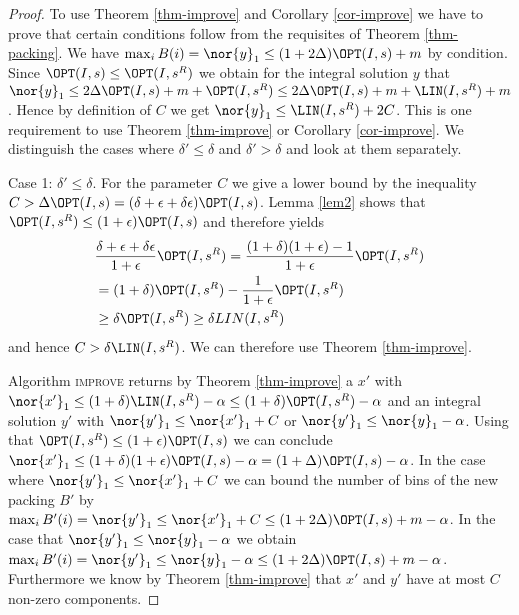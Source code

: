 \begin{proof}
	

    To use Theorem \ref{thm-improve} and Corollary \ref{cor-improve} we have to prove that certain conditions follow from the requisites of Theorem \ref{thm-packing}.
    We have $\max_i B (i) = \nor{y}_1 \leq (1+ 2\Delta) \OPT(I,s)+m$ by condition. Since
	$ \OPT(I,s) \leq  \OPT(I,s^{R})$ we obtain for the integral solution $y$ that
	$\nor{y}_1 \leq 2\Delta \OPT(I,s)+m + \OPT(I,s^{R}) \leq  2 \Delta \OPT(I,s)+ m + \LIN(I,s^{R}) +m$.
	Hence by definition of $C$ we get $\nor{y}_1 \leq  \LIN(I,s^{R}) + 2C$. This is one requirement to use Theorem \ref{thm-improve}
	or Corollary \ref{cor-improve}.
	We distinguish the cases where  $\delta' \leq \delta$ and $\delta' > \delta$ and look at them separately.
	
	Case 1: $\delta' \leq \delta$.
    For the parameter $C$ we give a lower bound by the inequality $C > \Delta \OPT(I,s) = (\delta + \epsilon + \delta \epsilon)\OPT(I,s)$. Lemma \ref{lem2} shows that $\OPT(I,s^R) \leq (1+\epsilon)\OPT(I,s)$ and therefore yields  
    \begin{align*}
    &\frac{\delta + \epsilon + \delta \epsilon}{1+ \epsilon} \OPT(I,s^R)
    = \frac{(1+\delta)(1+\epsilon)-1}{1+\epsilon} \OPT(I,s^R)\\
    &= (1+\delta)\OPT(I,s^R) - \frac{1}{1+\epsilon}\OPT(I,s^R)\\
        &\geq \delta \OPT(I,s^R) \geq \delta LIN(I,s^R)
    \end{align*}
    and hence $C > \delta \LIN(I,s^R)$. We can therefore use Theorem \ref{thm-improve}.
    
	Algorithm \textsc{improve} returns by Theorem \ref{thm-improve} a $x'$ with $\nor{x'}_1 \leq (1+\delta)\LIN(I,s^{R})-\alpha \leq (1+\delta)\OPT(I,s^{R})-\alpha$ and an integral solution $y'$ with	$\nor{y'}_1 \leq \nor{x'}_1 + C$ or $\nor{y'}_1 \leq \nor{y}_1 - \alpha$. Using that $\OPT(I,s^R) \leq (1+\epsilon)\OPT(I,s)$ we can conclude $\nor{x'}_1 \leq (1+ \delta)(1+ \epsilon)\OPT(I,s) - \alpha = (1+\Delta)\OPT(I,s) - \alpha$. In the case where $\nor{y'}_1 \leq \nor{x'}_1 + C$ we can bound the number of bins of the new packing $B'$ by	$\max_i B' (i) = \nor{y'}_1 \leq \nor{x'}_1 + C \leq (1 + 2 \Delta) \OPT(I,s)+ m - \alpha$.
	In the case that $\nor{y'}_1 \leq \nor{y}_1 - \alpha$ we obtain $\max_i B' (i) = \nor{y'}_1 \leq \nor{y}_1 - \alpha \leq (1+ 2\Delta) \OPT(I,s) +m- \alpha$. Furthermore we know by Theorem \ref{thm-improve} that $x'$ and $y'$ have at most $C$ non-zero components.
	

\end{proof}

